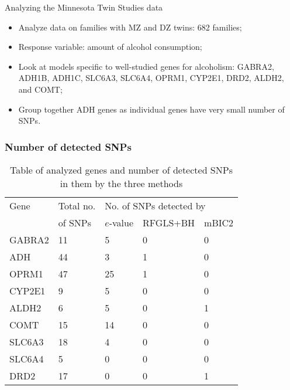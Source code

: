 \documentclass[handout,10pt]{beamer}
\begin{document}
\begin{frame}{Analyzing the Minnesota Twin Studies data}

\begin{itemize}
\item Analyze data on families with MZ and DZ twins: 682 families;

\item Response variable: amount of alcohol consumption;

\item Look at models specific to well-studied genes for alcoholism: GABRA2, ADH1B,
ADH1C, SLC6A3, SLC6A4, OPRM1, CYP2E1, DRD2, ALDH2, and COMT;

\item Group together ADH genes as individual genes have very small number of SNPs.
\end{itemize}
\end{frame}

\begin{frame}
\frametitle{Number of detected SNPs}

\begin{table}
\begin{footnotesize}
    \begin{tabular}{l|l|lll}
    \hline
    Gene   & Total no. & \multicolumn{3}{l}{No. of SNPs detected by }\\\cline{3-5}
    & of SNPs & $e$-value & RFGLS+BH & mBIC2 \\\hline
    GABRA2 & 11        & 5       & 0     & 0     \\
    ADH    & 44        & 3       & 1     & 0     \\
    OPRM1  & 47        & 25      & 1     & 0     \\
    CYP2E1 & 9         & 5       & 0     & 0     \\
    ALDH2  & 6         & 5       & 0     & 1     \\
    COMT   & 15        & 14      & 0     & 0     \\
    SLC6A3 & 18        & 4       & 0     & 0     \\
    SLC6A4 & 5         & 0       & 0     & 0     \\
    DRD2   & 17        & 0       & 0     & 1     \\\hline
    \end{tabular}
\end{footnotesize}
\caption{Table of analyzed genes and number of detected SNPs in them by the three methods}
\label{table:genetable}
\end{table}
\end{frame}
\end{document}
